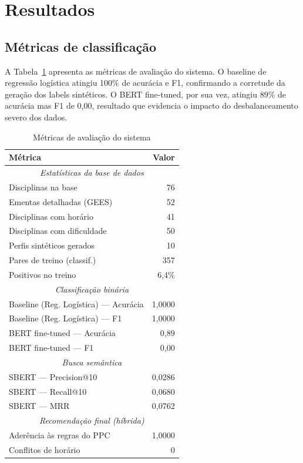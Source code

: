 \documentclass[12pt,a4paper]{article}
\begin{document}
\section{Resultados}

\subsection{Métricas de classificação}

A Tabela~\ref{tab:metrics} apresenta as métricas de avaliação do sistema. O baseline de regressão logística atingiu 100\% de acurácia e F1, confirmando a corretude da geração dos labels sintéticos. O BERT fine-tuned, por sua vez, atingiu 89\% de acurácia mas F1 de 0,00, resultado que evidencia o impacto do desbalanceamento severo dos dados.

\begin{table}[H]
\centering
\caption{Métricas de avaliação do sistema}
\label{tab:metrics}
\begin{tabular}{lr}
\toprule
\textbf{Métrica} & \textbf{Valor} \\
\midrule
\multicolumn{2}{c}{\textit{Estatísticas da base de dados}}\\
Disciplinas na base            & 76 \\
Ementas detalhadas (GEES)      & 52 \\
Disciplinas com horário        & 41 \\
Disciplinas com dificuldade    & 50 \\
Perfis sintéticos gerados      & 10 \\
Pares de treino (classif.)     & 357 \\
Positivos no treino            & 6,4\% \\
\midrule
\multicolumn{2}{c}{\textit{Classificação binária}}\\
Baseline (Reg. Logística) — Acurácia  & 1,0000 \\
Baseline (Reg. Logística) — F1        & 1,0000 \\
BERT fine-tuned — Acurácia            & 0,89 \\
BERT fine-tuned — F1                  & 0,00 \\
\midrule
\multicolumn{2}{c}{\textit{Busca semântica}}\\
SBERT — Precision@10           & 0,0286 \\
SBERT — Recall@10              & 0,0680 \\
SBERT — MRR                    & 0,0762 \\
\midrule
\multicolumn{2}{c}{\textit{Recomendação final (híbrida)}}\\
Aderência às regras do PPC     & 1,0000 \\
Conflitos de horário           & 0 \\
\bottomrule
\end{tabular}
\end{table}
\end{document}
